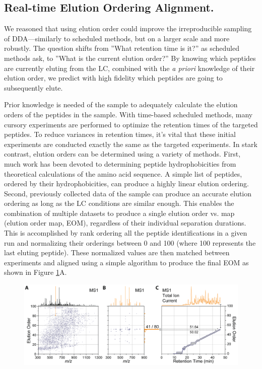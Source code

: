 \subsection*{Real-time Elution Ordering Alignment.}

We reasoned that using elution order could improve the irreproducible sampling of DDA---similarly to scheduled methods, but on a larger scale and more robustly. The question shifts from ''What retention time is it?'' as scheduled methods ask, to ''What is the current elution order?'' By knowing which peptides are currently eluting from the LC, combined with the \emph{a priori} knowledge of their elution order, we predict with high fidelity which peptides are going to subsequently elute. 

Prior knowledge is needed of the sample to adequately calculate the elution orders of the peptides in the sample. With time-based scheduled methods, many cursory experiments are performed to optimize the retention times of the targeted peptides. To reduce variances in retention times, it's vital that these initial experiments are conducted exactly the same as the targeted experiments. In stark contrast, elution orders can be determined using a variety of methods. First, much work has been devoted to determining peptide hydrophobicities from theoretical calculations of the amino acid sequence.\cite{ssrcalc,ssrcalc2,petritis,spicer} A simple list of peptides, ordered by their hydrophobicities, can produce a highly linear elution ordering. Second, previously collected data of the sample can produce an accurate elution ordering as long as the LC conditions are similar enough. This enables the combination of multiple datasets to produce a single elution order vs. \mz{} map (elution order map, EOM), regardless of their individual separation durations. This is accomplished by rank ordering all the peptide identifications in a given run and normalizing their orderings between 0 and 100 (where 100 represents the last eluting peptide). These normalized values are then matched between experiments and aligned using a simple algorithm to produce the final EOM as shown in Figure \ref{fig:eoa3}A.
\begin{figure}
	\centering
	\includegraphics[width=\columnwidth]{eoa/EOA 3.png}
	\label{fig:eoa3}
\end{figure}
